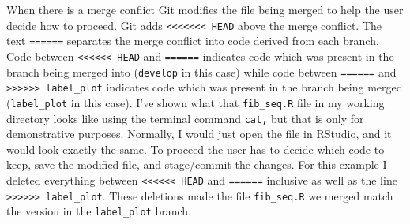 \documentclass[
  letterpaper,
  DIV=11,
  numbers=noendperiod]{scrreprt}
\newenvironment{Shaded}{\begin{snugshade}}{\end{snugshade}}
\newcommand{\NormalTok}[1]{\textcolor[rgb]{0.00,0.23,0.31}{#1}}
\begin{document}
\begin{Shaded}
\end{Shaded}

When there is a merge conflict Git modifies the file being merged to
help the user decide how to proceed. Git adds
\texttt{\textless{}\textless{}\textless{}\textless{}\textless{}\textless{}\textless{}\ HEAD}
above the merge conflict. The text \texttt{======} separates the merge
conflict into code derived from each branch. Code between
\texttt{\textless{}\textless{}\textless{}\textless{}\textless{}\textless{}\ HEAD}
and \texttt{======} indicates code which was present in the branch being
merged into (\texttt{develop} in this case) while code between
\texttt{======} and
\texttt{\textgreater{}\textgreater{}\textgreater{}\textgreater{}\textgreater{}\textgreater{}\ label\_plot}
indicates code which was present in the branch being merged
(\texttt{label\_plot} in this case). I've shown what that
\texttt{fib\_seq.R} file in my working directory looks like using the
terminal command \texttt{cat,} but that is only for demonstrative
purposes. Normally, I would just open the file in RStudio, and it would
look exactly the same. To proceed the user has to decide which code to
keep, save the modified file, and stage/commit the changes. For this
example I deleted everything between
\texttt{\textless{}\textless{}\textless{}\textless{}\textless{}\textless{}\ HEAD}
and \texttt{======} inclusive as well as the line
\texttt{\textgreater{}\textgreater{}\textgreater{}\textgreater{}\textgreater{}\textgreater{}\ label\_plot}.
These deletions made the file \texttt{fib\_seq.R} we merged match the
version in the \texttt{label\_plot} branch.
\end{document}

